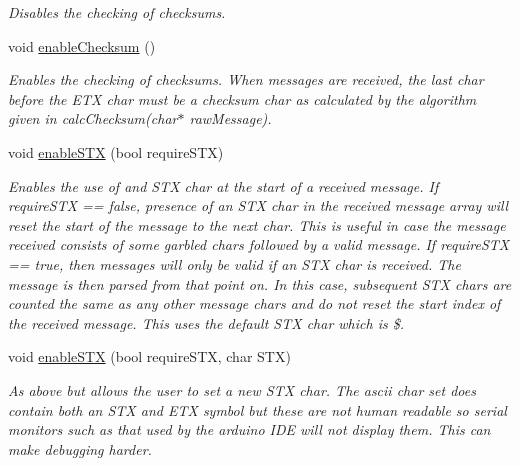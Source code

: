 \begin{DoxyCompactItemize}
\begin{DoxyCompactList}\small\item\em Disables the checking of checksums. \end{DoxyCompactList}\item 
\mbox{\label{class_serial_checker_ae1b4a8c6e776c5915714c3ed152633cc}} 
void \mbox{\hyperlink{class_serial_checker_ae1b4a8c6e776c5915714c3ed152633cc}{enable\+Checksum}} ()
\begin{DoxyCompactList}\small\item\em Enables the checking of checksums. When messages are received, the last char before the E\+TX char must be a checksum char as calculated by the algorithm given in calc\+Checksum(char$\ast$ raw\+Message). \end{DoxyCompactList}\item 
void \mbox{\hyperlink{class_serial_checker_a0292d1718016ff5377c9c5bd56f80149}{enable\+S\+TX}} (bool require\+S\+TX)
\begin{DoxyCompactList}\small\item\em Enables the use of and S\+TX char at the start of a received message. If require\+S\+TX == false, presence of an S\+TX char in the received message array will reset the start of the message to the next char. This is useful in case the message received consists of some garbled chars followed by a valid message. If require\+S\+TX == true, then messages will only be valid if an S\+TX char is received. The message is then parsed from that point on. In this case, subsequent S\+TX chars are counted the same as any other message chars and do not reset the start index of the received message. This uses the default S\+TX char which is \textquotesingle{}\$\textquotesingle{}. \end{DoxyCompactList}\item 
void \mbox{\hyperlink{class_serial_checker_a9a2714ca9e5706b4990753fb47cdd21a}{enable\+S\+TX}} (bool require\+S\+TX, char S\+TX)
\begin{DoxyCompactList}\small\item\em As above but allows the user to set a new S\+TX char. The ascii char set does contain both an S\+TX and E\+TX symbol but these are not human readable so serial monitors such as that used by the arduino I\+DE will not display them. This can make debugging harder. \end{DoxyCompactList}\item 
\mbox{\label{class_serial_checker_a0d68ae7dcc63103a8669ce28f1aa0069}} 

\end{DoxyCompactItemize}
